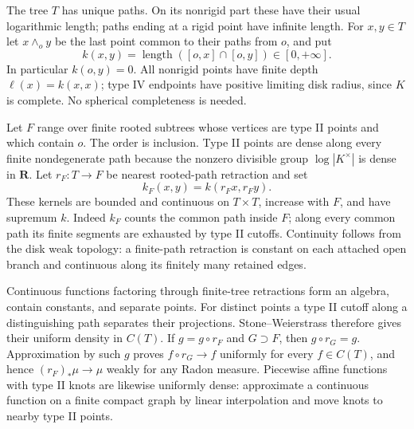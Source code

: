 \documentclass[
  11pt,
]{article}
\begin{document}
The tree \(T\) has unique paths. On its nonrigid part these have their
usual logarithmic length; paths ending at a rigid point have infinite
length. For \(x,y\in T\) let \(x\wedge_o y\) be the last point common to
their paths from \(o\), and put \[
k(x,y)=\operatorname{length}([o,x]\cap[o,y])\in[0,+\infty].
\] In particular \(k(o,y)=0\). All nonrigid points have finite depth
\(\ell(x)=k(x,x)\); type IV endpoints have positive limiting disk
radius, since \(K\) is complete. No spherical completeness is needed.

Let \(F\) range over finite rooted subtrees whose vertices are type II
points and which contain \(o\). The order is inclusion. Type II points
are dense along every finite nondegenerate path because the nonzero
divisible group \(\log|K^\times|\) is dense in \(\mathbf R\). Let
\(r_F:T\to F\) be nearest rooted-path retraction and set \[
k_F(x,y)=k(r_Fx,r_Fy).
\] These kernels are bounded and continuous on \(T\times T\), increase
with \(F\), and have supremum \(k\). Indeed \(k_F\) counts the common
path inside \(F\); along every common path its finite segments are
exhausted by type II cutoffs. Continuity follows from the disk weak
topology: a finite-path retraction is constant on each attached open
branch and continuous along its finitely many retained edges.

Continuous functions factoring through finite-tree retractions form an
algebra, contain constants, and separate points. For distinct points a
type II cutoff along a distinguishing path separates their projections.
Stone--Weierstrass therefore gives their uniform density in \(C(T)\). If
\(g=g\circ r_F\) and \(G\supset F\), then \(g\circ r_G=g\).
Approximation by such \(g\) proves \(f\circ r_G\to f\) uniformly for
every \(f\in C(T)\), and hence \((r_F)_*\mu\to\mu\) weakly for any Radon
measure. Piecewise affine functions with type II knots are likewise
uniformly dense: approximate a continuous function on a finite compact
graph by linear interpolation and move knots to nearby type II points.
\end{document}
